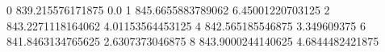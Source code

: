 0 839.215576171875 0.0
1 845.6655883789062 6.45001220703125
2 843.2271118164062 4.01153564453125
4 842.565185546875 3.349609375
6 841.8463134765625 2.6307373046875
8 843.9000244140625 4.6844482421875

